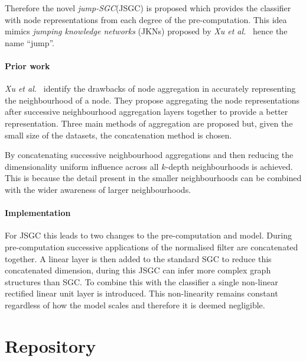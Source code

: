 Therefore the novel \emph{jump-SGC}(JSGC) is proposed which provides the classifier with node representations from each degree of the pre-computation.
This idea mimics \emph{jumping knowledge networks} (JKNs) proposed by \textit{Xu et al.}~\cite{xu2018representation} hence the name ``jump''.

\paragraph{Prior work}
\textit{Xu et al.}~\cite{xu2018representation} identify the drawbacks of node aggregation in accurately representing the neighbourhood of a node.
They propose aggregating the node representations after successive neighbourhood aggregation layers together to provide a better representation.
Three main methods of aggregation are proposed but, given the small size of the datasets, the concatenation method is chosen.

By concatenating successive neighbourhood aggregations and then reducing the dimensionality uniform influence across all $k$-depth neighbourhoods is achieved.
This is because the detail present in the smaller neighbourhoods can be combined with the wider awareness of larger neighbourhoods.

\paragraph{Implementation}
For JSGC this leads to two changes to the pre-computation and model.
During pre-computation successive applications of the normalised filter are concatenated together.
A linear layer is then added to the standard SGC to reduce this concatenated dimension, during this JSGC can infer more complex graph structures than SGC.
To combine this with the classifier a single non-linear rectified linear unit layer is introduced.
This non-linearity remains constant regardless of how the model scales and therefore it is deemed negligible.

\section{Repository}

